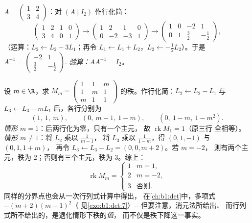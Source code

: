 \begin{example}\label{ex:b1:matrices:inverse}
$A = \begin{pmatrix} 1 & 2 \\ 3 & 4 \end{pmatrix}$：对 $(A \mid
I_2)$ 作行化简：
\[
\begin{pmatrix} 1 & 2 & 1 & 0\\ 3 & 4 & 0 & 1 \end{pmatrix}
\to
\begin{pmatrix} 1 & 2 & 1 & 0\\ 0 & -2 & -3 & 1 \end{pmatrix}
\to
\begin{pmatrix} 1 & 0 & -2 & 1\\ 0 & 1 & \tfrac32 & -\tfrac12
\end{pmatrix},
\]
（运算：$L_2 \leftarrow L_2 - 3L_1$；再令 $L_1 \leftarrow L_1
+ L_2$，$L_2 \leftarrow -\frac12 L_2$）。于是 $A^{-1} =
\begin{pmatrix} -2 & 1 \\ \tfrac32 & -\tfrac12\end{pmatrix}$.
\emph{验算：}$AA^{-1} = I_2$。
\end{example}

\begin{example}
\label{ex:b1:matrices:rankparameter}
设 $m \in \R$，求
$M_m = \begin{pmatrix} 1 & 1 & m\\ 1 & m & 1\\ m & 1 &
1\end{pmatrix}$ 的秩。作行化简：$L_2 \leftarrow L_2 - L_1$ 与 $L_3
\leftarrow L_3 - mL_1$ 后，各行分别为
\[
(1,\ 1,\ m), \qquad (0,\ m - 1,\ 1 - m), \qquad
(0,\ 1 - m,\ 1 - m^2).
\]
\emph{情形 $m = 1$}：后两行化为零，只有一个主元，
故 $\operatorname{rk} M_1 = 1$（原三行
全相等）。\emph{情形 $m \neq 1$}：将 $L_2$ 乘以 $\frac1{m-1}$，
将 $L_3$ 乘以 $\frac1{1-m}$，得 $(0, 1, -1)$ 与 $(0, 1, 1 + m)$，
再令 $L_3 \leftarrow L_3 - L_2 = (0, 0, m + 2)$。若 $m = -2$，
则有两个主元，秩为 $2$；否则有三个主元，秩为 $3$。综上：
\[
\operatorname{rk} M_m =
\begin{cases}
1 & m = 1,\\
2 & m = -2,\\
3 & \text{否则}.
\end{cases}
\]
同样的分界点也会从一次行列式计算中得出，
在\cref{ch:b1:det}中，多项式 $-(m+2)(m-1)^2$（
见\cref{exo:b1:det:7}）---但要注意，消元法所给出、
而行列式所不给出的，是退化情形下秩的\emph{值}，
而不仅是秩下降这一事实。
\end{example}

